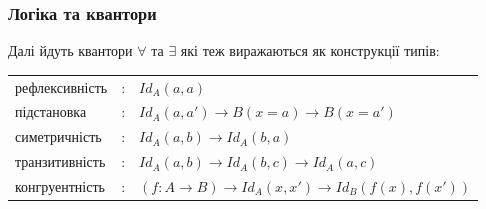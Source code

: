 \documentclass[11pt,oneside]{article}
\begin{document}
  \subsubsection{Логіка та квантори}

Далі йдуть квантори $\forall$ та $\exists$ які теж виражаються як конструкції типів:

\begingroup
\parbox[t][][l]{0.40\textwidth}{

\begin{prooftree}
\end{prooftree}

\begin{prooftree}
\end{prooftree}

}
\hspace{0.1cm}
\parbox[t][][r]{0.60\textwidth}{

\begin{prooftree}
\end{prooftree}


\begin{prooftree}
\end{prooftree}

}
\endgroup

\begingroup
\parbox[t][][l]{0.40\textwidth}{

\begin{prooftree}
\end{prooftree}

}
\hspace{0.1cm}
\parbox[t][][r]{0.60\textwidth}{

}\endgroup


\begin{center}
\begin{tabular}{lll}
  рефлексивність &:& $Id_A(a,a)$ \\
  підстановка     &:& $Id_A(a,a') \rightarrow B(x=a) \rightarrow B(x=a')$ \\
  симетричність  &:& $Id_A(a,b) \rightarrow Id_A(b,a)$  \\
  транзитивність &:& $Id_A(a,b) \rightarrow Id_A(b,c) \rightarrow Id_A(a,c)$ \\
  конгруентність &:& $(f: A \rightarrow B) \rightarrow Id_A(x,x') \rightarrow Id_B(f(x),f(x'))$ \\
\end{tabular}
\end{center}
\end{document}
